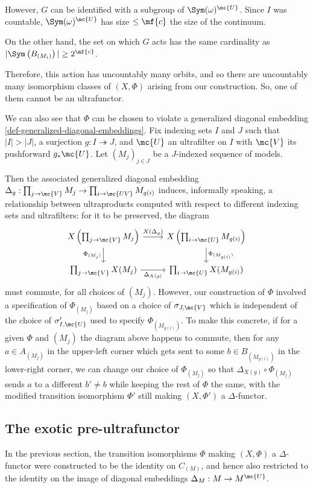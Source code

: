 However, $G$ can be identified with a subgroup of $\Sym(\omega)^{\mc{U}}$. Since $I$ was countable, $\Sym(\omega)^{\mc{U}}$ has size $\leq \mf{c}$ the size of the continuum.

On the other hand, the set on which $G$ acts has the same cardinality as $|\Sym\left(B_{(M_i)}\right)| \geq 2^{\mf{c}}$.

Therefore, this action has uncountably many orbits, and so there are uncountably many isomorphism classes of $(X,\Phi)$ arising from our construction. So, one of them cannot be an ultrafunctor.

We can also see that $\Phi$ can be chosen to violate a generalized diagonal embedding \ref{def-generalized-diagonal-embeddings}. Fix indexing sets $I$ and $J$ such that $|I| > |J|$, a surjection $g : I \twoheadrightarrow J$, and $\mc{U}$ an ultrafilter on $I$ with $\mc{V}$ its pushforward $g_* \mc{U}$. Let $(M_j)_{j \in J}$ be a $J$-indexed sequence of models.

Then the associated generalized diagonal embedding $\Delta_g : \prod_{j \to \mc{V}} M_j \to \prod_{i \to \mc{UV}} M_{g(i)}$ induces, informally speaking, a relationship between ultraproducts computed with respect to different indexing sets and ultrafilters: for it to be preserved, the diagram
$$
\begin{tikzcd}[ampersand replacement = \&]
X \left( \prod_{j \to \mc{V}} M_j\right) \arrow[swap]{d}{\Phi_{(M_j)}} \arrow{r}{X(\Delta_g)} \& X\left(\prod_{i \to \mc{U}} M_{g(i)}\right) \arrow{d}{\Phi_{(M_{g(i)})}}\\
 \prod_{j \to \mc{V}} X(M_j) \arrow[swap]{r}{\Delta_{X(g)}} \& \prod_{i \to \mc{U}} X(M_{g(i)})
  \end{tikzcd}
$$
must commute, for all choices of $(M_j)$. However, our construction of $\Phi$ involved a specification of $\Phi_{(M_j)}$ based on a choice of $\sigma_{J, \mc{V}}$ which is independent of the choice of $\sigma'_{I, \mc{U}}$ used to specify $\Phi_{(M_{g(i)})}$. To make this concrete, if for a given $\Phi$ and $(M_j)$ the diagram above happens to commute, then for any $a \in A_{(M_j)}$ in the upper-left corner which gets sent to some $b \in B_{(M_{g(i)})}$ in the lower-right corner, we can change our choice of $\Phi_{(M_j)}$ so that $\Delta_{X(g)} \circ \Phi_{(M_j)}$ sends $a$ to a different $b' \neq b$ while keeping the rest of $\Phi$ the same, with the modified transition isomorphism $\Phi'$ still making $(X,\Phi')$ a $\Delta$-functor.

\subsection{The exotic pre-ultrafunctor}
\label{exotic-pre-ultrafunctor}
In the previous section, the transition isomorphisms $\Phi$ making $(X,\Phi)$ a $\Delta$-functor were constructed to be the identity on $C_{(M)}$, and hence also restricted to the identity on the image of diagonal embeddings $\Delta_M : M \to M^{\mc{U}}$.

